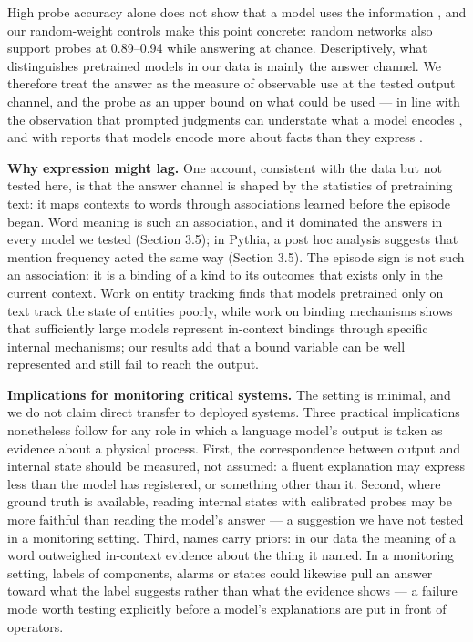 \documentclass[11pt]{article}
\begin{document}
High probe accuracy alone does not show that a model uses the information \citep{hewitt2019,belinkov2021,elazar2020}, and our random-weight controls make this point concrete: random networks also support probes at 0.89--0.94 while answering at chance. Descriptively, what distinguishes pretrained models in our data is mainly the answer channel. We therefore treat the answer as the measure of observable use at the tested output channel, and the probe as an upper bound on what could be used --- in line with the observation that prompted judgments can understate what a model encodes \citep{hu2023}, and with reports that models encode more about facts than they express \citep{orgad2024,gekhman2025}.

\textbf{Why expression might lag.} One account, consistent with the data but not tested here, is that the answer channel is shaped by the statistics of pretraining text: it maps contexts to words through associations learned before the episode began. Word meaning is such an association, and it dominated the answers in every model we tested (Section 3.5); in Pythia, a post hoc analysis suggests that mention frequency acted the same way (Section 3.5). The episode sign is not such an association: it is a binding of a kind to its outcomes that exists only in the current context. Work on entity tracking \citep{kim2023} finds that models pretrained only on text track the state of entities poorly, while work on binding mechanisms \citep{feng2023} shows that sufficiently large models represent in-context bindings through specific internal mechanisms; our results add that a bound variable can be well represented and still fail to reach the output.

\textbf{Implications for monitoring critical systems.} The setting is minimal, and we do not claim direct transfer to deployed systems. Three practical implications nonetheless follow for any role in which a language model's output is taken as evidence about a physical process. First, the correspondence between output and internal state should be measured, not assumed: a fluent explanation may express less than the model has registered, or something other than it. Second, where ground truth is available, reading internal states with calibrated probes may be more faithful than reading the model's answer --- a suggestion we have not tested in a monitoring setting. Third, names carry priors: in our data the meaning of a word outweighed in-context evidence about the thing it named. In a monitoring setting, labels of components, alarms or states could likewise pull an answer toward what the label suggests rather than what the evidence shows --- a failure mode worth testing explicitly before a model's explanations are put in front of operators.
\end{document}
